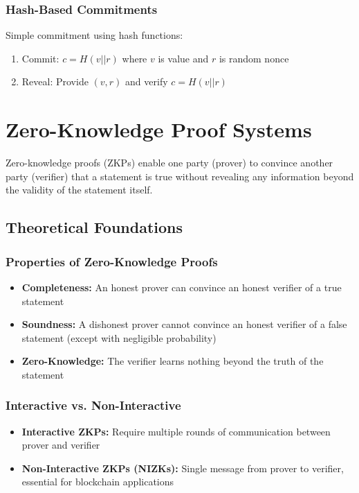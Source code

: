 \subsubsection{Hash-Based Commitments}
Simple commitment using hash functions:
\begin{enumerate}
    \item Commit: $c = H(v || r)$ where $v$ is value and $r$ is random nonce
    \item Reveal: Provide $(v, r)$ and verify $c = H(v || r)$
\end{enumerate}

\section{Zero-Knowledge Proof Systems}

Zero-knowledge proofs (ZKPs) enable one party (prover) to convince another party (verifier) that a statement is true without revealing any information beyond the validity of the statement itself.

\subsection{Theoretical Foundations}

\subsubsection{Properties of Zero-Knowledge Proofs}
\begin{itemize}
    \item \textbf{Completeness:} An honest prover can convince an honest verifier of a true statement
    \item \textbf{Soundness:} A dishonest prover cannot convince an honest verifier of a false statement (except with negligible probability)
    \item \textbf{Zero-Knowledge:} The verifier learns nothing beyond the truth of the statement
\end{itemize}

\subsubsection{Interactive vs. Non-Interactive}
\begin{itemize}
    \item \textbf{Interactive ZKPs:} Require multiple rounds of communication between prover and verifier
    \item \textbf{Non-Interactive ZKPs (NIZKs):} Single message from prover to verifier, essential for blockchain applications
\end{itemize}

